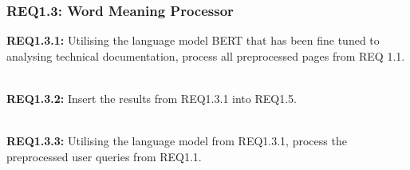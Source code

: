 \subsubsection{REQ1.3: Word Meaning Processor}

\textbf{REQ1.3.1: }Utilising the language model BERT that has been fine tuned to analysing technical documentation, process all preprocessed pages from REQ 1.1.\par
\textbf{\\REQ1.3.2: }Insert the results from REQ1.3.1 into REQ1.5.\par
\textbf{\\REQ1.3.3: }Utilising the language model from REQ1.3.1, process the preprocessed user queries from REQ1.1.
